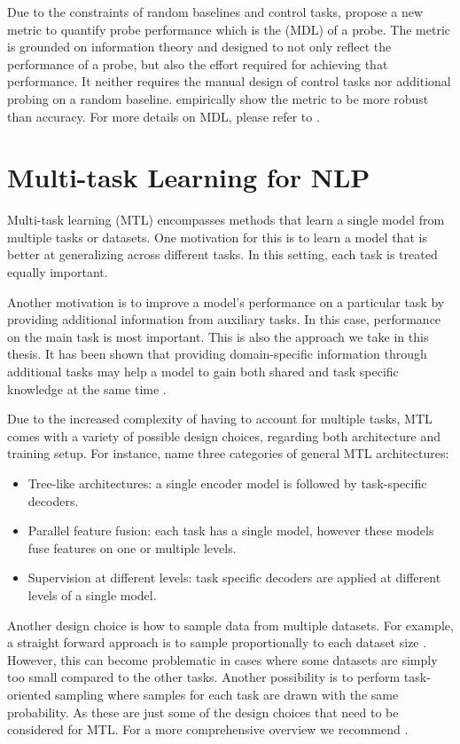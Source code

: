 Due to the constraints of random baselines and control tasks, \citep{voita-titov-2020-information} propose a new metric to quantify probe performance which is the  (MDL) of a probe. The metric is grounded on information theory \citep{shannon1948mathematical} and designed to not only reflect the performance of a probe, but also the effort required for achieving that performance. It neither requires the manual design of control tasks nor additional probing on a random baseline. \citep{voita-titov-2020-information} empirically show the metric to be more robust than accuracy. For more details on MDL, please refer to .

\section{Multi-task Learning for NLP}
Multi-task learning (MTL) encompasses methods that learn a single model from multiple tasks or datasets. One motivation for this is to learn a model that is better at generalizing across different tasks. In this setting, each task is treated equally important.

Another motivation is to improve a model's performance on a particular task by providing additional information from auxiliary tasks. In this case, performance on the main task is most important. This is also the approach we take in this thesis. It has been shown that providing domain-specific information through additional tasks may help a model to gain both shared and task specific knowledge at the same time \citep{ma2018modeling, tang2020progressive, xi2021modeling, zhao2019multiple}.

Due to the increased complexity of having to account for multiple tasks, MTL comes with a variety of possible design choices, regarding both architecture and training setup. For instance, \citet{DBLP:journals/corr/abs-2109-09138} name three categories of general MTL architectures:
\begin{itemize}
    \item Tree-like architectures: a single encoder model is followed by task-specific decoders.
    \item Parallel feature fusion: each task has a single model, however these models fuse features on one or multiple levels.
    \item Supervision at different levels: task specific decoders are applied at different levels of a single model.
\end{itemize}
Another design choice is how to sample data from multiple datasets. For example, a straight forward approach is to sample proportionally to each dataset size \citep{DBLP:journals/corr/abs-1811-06031}. However, this can become problematic in cases where some datasets are simply too small compared to the other tasks. Another possibility is to perform task-oriented sampling \citep{DBLP:journals/corr/ZhangXWJ17} where samples for each task are drawn with the same probability. As these are just some of the design choices that need to be considered for MTL. For a more comprehensive overview we recommend \citep{DBLP:journals/corr/abs-2109-09138, DBLP:journals/corr/abs-2007-16008}.

